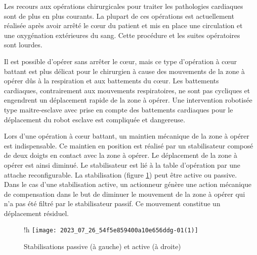 %
%
%
%
%

Les recours aux opérations chirurgicales pour traiter les pathologies cardiaques sont de plus en plus courants. La plupart de ces opérations est actuellement réalisée après avoir arrêté le cœur du patient et mis en place une circulation et une oxygénation extérieures du sang. Cette procédure et les suites opératoires sont lourdes.

Il est possible d'opérer sans arrêter le cœur, mais ce type d'opération à cœur battant est plus délicat pour le chirurgien à cause des mouvements de la zone à opérer dûs à la respiration et aux battements du cœur. Les battements cardiaques, contrairement aux mouvements respiratoires, ne sont pas cycliques et engendrent un déplacement rapide de la zone à opérer. Une intervention robotisée type maitre-esclave avec prise en compte des battements cardiaques pour le déplacement du robot esclave est compliquée et dangereuse.

Lors d'une opération à cœur battant, un maintien mécanique de la zone à opérer est indispensable. Ce maintien en position est réalisé par un stabilisateur composé de deux doigts en contact avec la zone à opérer. Le déplacement de la zone à opérer est ainsi diminué. Le stabilisateur est lié à la table d'opération par une attache reconfigurable. La stabilisation (figure \ref{fig:01}) peut être active ou passive. Dans le cas d'une stabilisation active, un actionneur génère une action mécanique de compensation dans le but de diminuer le mouvement de la zone à opérer qui n'a pas été filtré par le stabilisateur passif. Ce mouvement constitue un déplacement résiduel.
\begin{figure}{!h}
\centering
\texttt{[image: 2023\_07\_26\_54f5e859400a10e656ddg-01(1)]}
\caption{Stabilisations passive (à gauche) et active (à droite) \label{fig:01}}
\end{figure}

